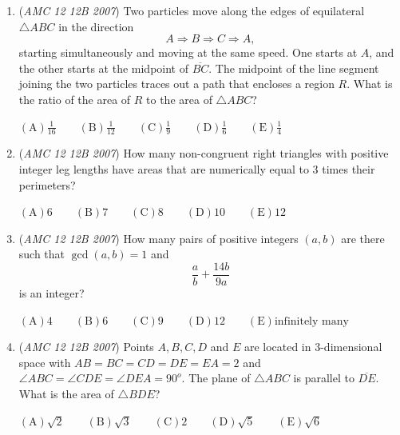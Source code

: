 \begin{enumerate}
 $\mathrm {(A)} 100\qquad \mathrm {(B)} 101\qquad \mathrm {(C)} 102\qquad \mathrm {(D)} 103\qquad \mathrm {(E)} 104$


	\item (\textit{AMC 12 12B 2007}) Two particles move along the edges of equilateral $\triangle ABC$ in the direction 
 \[A\Rightarrow B\Rightarrow C\Rightarrow A,\] starting simultaneously and moving at the same speed. One starts at $A$, and the other starts at the midpoint of $\overline{BC}$. The midpoint of the line segment joining the two particles traces out a path that encloses a region $R$. What is the ratio of the area of $R$ to the area of $\triangle ABC$?


 $\mathrm {(A)} \frac{1}{16}\qquad \mathrm {(B)} \frac{1}{12}\qquad \mathrm {(C)} \frac{1}{9}\qquad \mathrm {(D)} \frac{1}{6}\qquad \mathrm {(E)} \frac{1}{4}$


	\item (\textit{AMC 12 12B 2007}) How many non-congruent right triangles with positive integer leg lengths have areas that are numerically equal to $3$ times their perimeters?


 $\mathrm {(A)} 6\qquad \mathrm {(B)} 7\qquad \mathrm {(C)} 8\qquad \mathrm {(D)} 10\qquad \mathrm {(E)} 12$


	\item (\textit{AMC 12 12B 2007}) How many pairs of positive integers $(a,b)$ are there such that $\gcd{(a,b)}=1$ and 
 \[\frac{a}{b}+\frac{14b}{9a}\] is an integer?


 $\mathrm {(A)} 4\qquad \mathrm {(B)} 6\qquad \mathrm {(C)} 9\qquad \mathrm {(D)} 12\qquad \mathrm {(E)} \text{infinitely many}$


	\item (\textit{AMC 12 12B 2007}) Points $A,B,C,D$ and $E$ are located in 3-dimensional space with $AB=BC=CD=DE=EA=2$ and $\angle ABC=\angle CDE=\angle DEA=90^o$. The plane of $\triangle ABC$ is parallel to $\overline{DE}$. What is the area of $\triangle BDE$?


 $\mathrm {(A)} \sqrt{2}\qquad \mathrm {(B)} \sqrt{3}\qquad \mathrm {(C)} 2\qquad \mathrm {(D)} \sqrt{5}\qquad \mathrm {(E)} \sqrt{6}$


\end{enumerate}